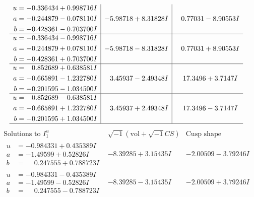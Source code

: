 \documentclass[1p]{elsarticle_modified}
\theoremstyle{definition}
\newcommand{\I}{\sqrt{-1}}
\begin{document}
$$\begin{array}{c|c|c}
\begin{aligned}
u &= -0.336434 + 0.998716 I \\
a &= -0.244879 - 0.078110 I \\
b &= -0.428361 - 0.703700 I\end{aligned}
 & -5.98718 + 8.31828 I & \phantom{-}0.77031 - 8.90553 I \\ \hline\begin{aligned}
u &= -0.336434 - 0.998716 I \\
a &= -0.244879 + 0.078110 I \\
b &= -0.428361 + 0.703700 I\end{aligned}
 & -5.98718 - 8.31828 I & \phantom{-}0.77031 + 8.90553 I \\ \hline\begin{aligned}
u &= \phantom{-}0.852689 + 0.638581 I \\
a &= -0.665891 - 1.232780 I \\
b &= -0.201595 - 1.034500 I\end{aligned}
 & \phantom{-}3.45937 - 2.49348 I & \phantom{-}17.3496 + 3.7147 I \\ \hline\begin{aligned}
u &= \phantom{-}0.852689 - 0.638581 I \\
a &= -0.665891 + 1.232780 I \\
b &= -0.201595 + 1.034500 I\end{aligned}
 & \phantom{-}3.45937 + 2.49348 I & \phantom{-}17.3496 - 3.7147 I\\
 \hline 
 \end{array}$$\newpage$$\begin{array}{c|c|c}  
\text{Solutions to }I^u_{1}& \I (\text{vol} + \sqrt{-1}CS) & \text{Cusp shape}\\
 \hline 
\begin{aligned}
u &= -0.984331 + 0.435389 I \\
a &= -1.49599 + 0.52826 I \\
b &= \phantom{-}0.247555 + 0.788723 I\end{aligned}
 & -8.39285 + 3.15435 I & -2.00509 - 3.79246 I \\ \hline\begin{aligned}
u &= -0.984331 - 0.435389 I \\
a &= -1.49599 - 0.52826 I \\
b &= \phantom{-}0.247555 - 0.788723 I\end{aligned}
 & -8.39285 - 3.15435 I & -2.00509 + 3.79246 I \\ \hline\begin{aligned}

\end{aligned}
\end{array}$$
\end{document}
